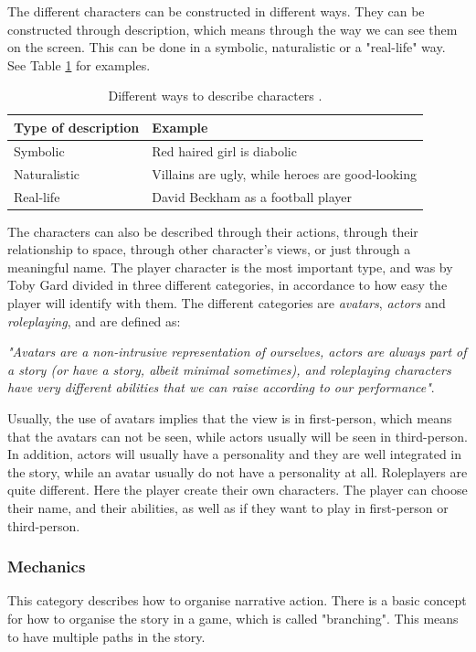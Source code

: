 The different characters can be constructed in different ways. They can be constructed through description, which means through the way we can see them on the screen. This can be done in a symbolic, naturalistic or a "real-life" way. See Table \ref{tab:description} for examples.

\begin{table}
\centering
    \begin{tabular}{|l|l|}
        \hline
        \textbf{Type of description} & \textbf{Example} \\ \hline
       Symbolic & Red haired girl is diabolic  \\ \hline
       Naturalistic & Villains are ugly, while heroes are good-looking \\ \hline
       Real-life & David Beckham as a football player \\ \hline
    \end{tabular}
    \caption[Different ways to describe characters]{Different ways to describe characters \cite{understandingvg}.}
    \label{tab:description}
\end{table} 

The characters can also be described through their actions, through their relationship to space, through other character’s views, or just through a meaningful name. The player character is the most important type, and was by Toby Gard divided in three different categories, in accordance to how easy the player will identify with them. The different categories are \emph{avatars}, \emph{actors} and \emph{roleplaying}, and are defined as:

\emph{"Avatars are a non-intrusive representation of ourselves, actors are always part of a story (or have a story, albeit minimal sometimes), and roleplaying characters have very different abilities that we can raise according to our performance"}. \cite{understandingvg}

Usually, the use of avatars implies that the view is in first-person, which means that the avatars can not be seen, while actors usually will be seen in third-person. In addition, actors will usually have a personality and they are well integrated in the story, while an avatar usually do not have a personality at all. Roleplayers are quite different. Here the player create their own characters. The player can choose their name, and their abilities, as well as if they want to play in first-person or third-person.  

\subsubsection{Mechanics}
This category describes how to organise narrative action. There is a basic concept for how to organise the story in a game, which is called "branching". This means to have multiple paths in the story. 

